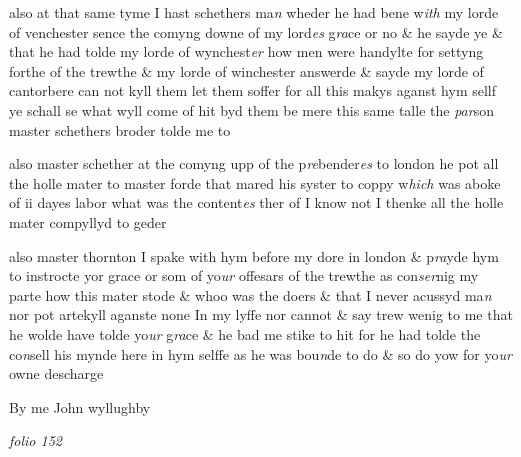 \documentclass[12pt, a4paper]{book}
\begin{document}
		\ifthenelse{\isodd{\thepage}}
		{\reversemarginpar}
		{\normalmarginpar}
		also at that same tyme I hast schethers ma\textit{n }wheder he had bene
 		w\textit{ith} my lorde of venchester sence the comyng downe of my lord\textit{es}
 			g\textit{ra}ce or no \& he sayde ye \& that he had tolde my lorde of wynchest\textit{er}
 how men were handylte for settyng forthe of the trewthe \&
 		my lorde of winchester answerde \& sayde my lorde of
 			cantorbere can not kyll them let them soffer for all this
 makys aganst hym sellf ye schall se what wyll come of hit
 byd them be mere this same talle the \textit{par}son master schethers
 broder tolde me to
 	
		\ifthenelse{\isodd{\thepage}}
		{\reversemarginpar}
		{\normalmarginpar}
		also master schether at the comyng upp of the p\textit{re}bender\textit{es} to
 		london he pot all the holle mater to master forde that mared
 his syster to coppy w\textit{hich} was aboke of ii dayes labor what was
 the content\textit{es} ther of I know not I thenke all the holle mater
 compyllyd to geder
 	
		\ifthenelse{\isodd{\thepage}}
		{\reversemarginpar}
		{\normalmarginpar}
		also master thornton I spake with hym before my dore in london \& p\textit{ra}yde
 hym to instrocte yor grace or som of yo\textit{ur }offesars of the trewthe as
 con\textit{ser}nig my parte how this mater stode \& whoo was the doers \& that
 I never acussyd ma\textit{n} nor pot artekyll aganste none In my lyffe nor
 cannot \& say trew wenig to me that he wolde have tolde yo\textit{ur} g\textit{ra}ce
 \& he bad me stike to hit for he had tolde the co\textit{n}sell his mynde here
 in hym selffe as he was bou\textit{n}de to do \& so do yow for yo\textit{ur} owne descharge
 	
		\ifthenelse{\isodd{\thepage}}
		{\reversemarginpar}
		{\normalmarginpar}
		By me John wyllughby

\dotfill
					

\textit{folio 152}


         \vspace{4cm}
         
\dotfill
					  \section*{}  \subsection*{}
\end{document}
